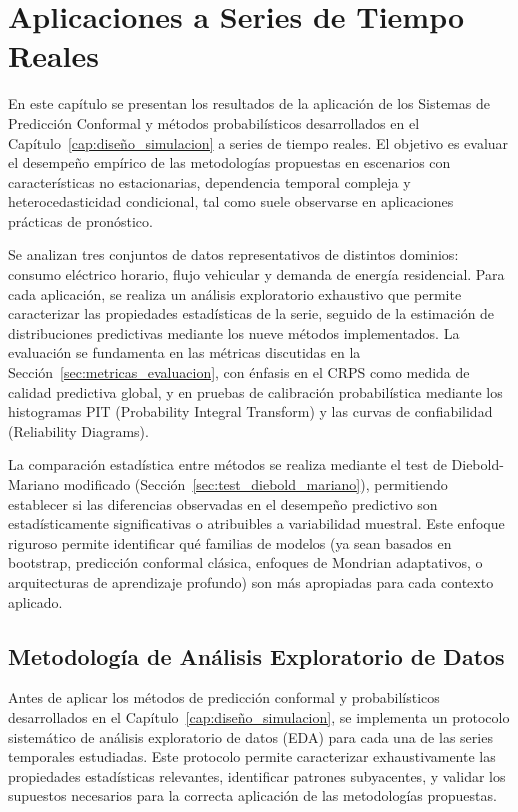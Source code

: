 \chapter{Aplicaciones a Series de Tiempo Reales}
\label{cap:aplicaciones}

En este capítulo se presentan los resultados de la aplicación de los Sistemas de Predicción Conformal y métodos probabilísticos desarrollados en el Capítulo~\ref{cap:diseño_simulacion} a series de tiempo reales. El objetivo es evaluar el desempeño empírico de las metodologías propuestas en escenarios con características no estacionarias, dependencia temporal compleja y heterocedasticidad condicional, tal como suele observarse en aplicaciones prácticas de pronóstico.

Se analizan tres conjuntos de datos representativos de distintos dominios: consumo eléctrico horario, flujo vehicular y demanda de energía residencial. Para cada aplicación, se realiza un análisis exploratorio exhaustivo que permite caracterizar las propiedades estadísticas de la serie, seguido de la estimación de distribuciones predictivas mediante los nueve métodos implementados. La evaluación se fundamenta en las métricas discutidas en la Sección~\ref{sec:metricas_evaluacion}, con énfasis en el CRPS como medida de calidad predictiva global, y en pruebas de calibración probabilística mediante los histogramas PIT (Probability Integral Transform) y las curvas de confiabilidad (Reliability Diagrams).

La comparación estadística entre métodos se realiza mediante el test de Diebold-Mariano modificado (Sección~\ref{sec:test_diebold_mariano}), permitiendo establecer si las diferencias observadas en el desempeño predictivo son estadísticamente significativas o atribuibles a variabilidad muestral. Este enfoque riguroso permite identificar qué familias de modelos (ya sean basados en bootstrap, predicción conformal clásica, enfoques de Mondrian adaptativos, o arquitecturas de aprendizaje profundo) son más apropiadas para cada contexto aplicado.

\section{Metodología de Análisis Exploratorio de Datos}
\label{sec:metodologia_eda}

Antes de aplicar los métodos de predicción conformal y probabilísticos desarrollados en el Capítulo~\ref{cap:diseño_simulacion}, se implementa un protocolo sistemático de análisis exploratorio de datos (EDA) para cada una de las series temporales estudiadas. Este protocolo permite caracterizar exhaustivamente las propiedades estadísticas relevantes, identificar patrones subyacentes, y validar los supuestos necesarios para la correcta aplicación de las metodologías propuestas.

